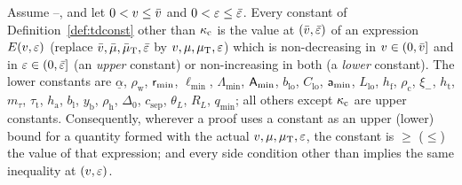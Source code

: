 \begin{lemma}[monotonicity]\label{lem:mono}
Assume --, and let $0<v\le\bar v$ and $0<\varepsilon\le\bar\varepsilon$. Every constant of
Definition~\ref{def:tdconst} other than $\kappa_{\mathrm c}$ is the value at $(\bar v,\bar\varepsilon)$ of an
expression $E(v,\varepsilon)$ (replace $\bar v,\bar\mu,\bar\mu_{\mathrm T},\bar\varepsilon$ by $v,\mu,\mu_{\mathrm T},\varepsilon$) which is non-decreasing in $v\in(0,\bar v]$ and in
$\varepsilon\in(0,\bar\varepsilon]$ (an \emph{upper} constant) or non-increasing in both (a \emph{lower} constant). The lower constants are
$\underline\alpha$, $\rho_{\mathrm w}$, $\mathsf r_{\min}$, $\ell_{\min}$, $\Lambda_{\min}$, $\mathsf A_{\min}$, $b_{\mathrm{lo}}$, $C_{\mathrm{lo}}$,
$\mathsf a_{\min}$, $L_{\mathrm{lo}}$, $h_{\mathrm f}$, $\rho_{\mathrm c}$, $\xi_-$, $h_{\mathrm t}$, $m_\tau$, $\tau_{\mathrm t}$, $h_{\mathrm a}$,
$b_{\mathrm l}$, $y_{\mathrm b}$, $\rho_{\mathrm h}$, $\Delta_0$, $c_{\mathrm{sep}}$, $\theta_L$, $R_L$, $q_{\min}$; all others except $\kappa_{\mathrm c}$
are upper constants.
Consequently, wherever a proof uses a constant as an upper (lower) bound for a quantity formed with the actual $v,\mu,\mu_{\mathrm T},\varepsilon$, the
constant is $\ge$ ($\le$) the value of that expression; and every side condition other than  implies the same
inequality at $(v,\varepsilon)$.
\end{lemma}
